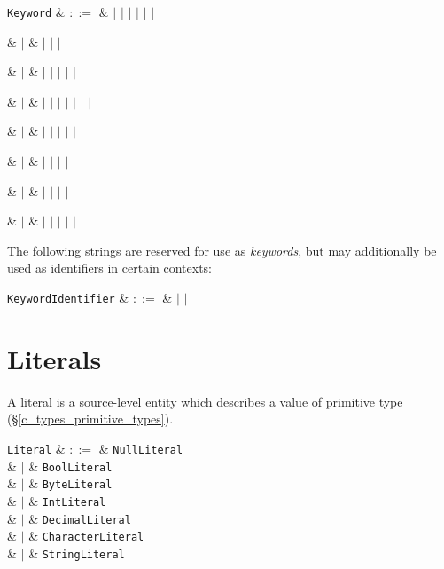 \begin{syntax}
\verb+Keyword+ & $::=$ &  $|$  $|$
 $|$  $|$  $|$ 
$|$ \\

{\huge\strut} & $|$ &  $|$  $|$  $|$ \\
{\huge\strut} & $|$ &  $|$  $|$  $|$  $|$  $|$ \\
{\huge\strut} & $|$ &  $|$  $|$  $|$  $|$  $|$  $|$  $|$  \\
{\huge\strut} & $|$ &  $|$  $|$  $|$  $|$  $|$  $|$ \\
{\huge\strut} & $|$ &   $|$  $|$  $|$  $|$ \\
{\huge\strut} & $|$ &  $|$  $|$  $|$  $|$ \\
{\huge\strut} & $|$ &  $|$  $|$  $|$  $|$  $|$  $|$ \\
\end{syntax}

The following strings are reserved for use as {\em keywords}, but may additionally be used as identifiers in certain contexts:
\begin{syntax}
\verb+KeywordIdentifier+ & $::=$ &  $|$  $|$ \\
\end{syntax}



\section{Literals}

A \gls{literal} is a source-level entity which describes a value of primitive type (\S\ref{c_types_primitive_types}).

\begin{syntax}
\verb+Literal+ & $::=$ &  \verb+NullLiteral+ \\
  & $|$ & \verb+BoolLiteral+ \\
  & $|$ & \verb+ByteLiteral+ \\
  & $|$ & \verb+IntLiteral+ \\
  & $|$ & \verb+DecimalLiteral+ \\
  & $|$ & \verb+CharacterLiteral+ \\
  & $|$ & \verb+StringLiteral+ \\
\\
\end{syntax}

